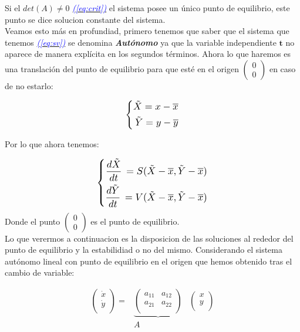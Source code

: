 \documentclass[12pt,a4paper]{report} %
\newcommand{\eref}[1]{\hyperref[#1]{\textcolor{blue}{\textit{(\ref*{#1})}}}}
\begin{document}
	Si el $det(A)\neq0$ \eref{eq:crit} el sistema posee un único punto de equilibrio, este punto se dice solucion constante del sistema.
    \\[0.5cm]
    Veamos esto más en profundiad, primero tenemos que saber que el sistema que tenemos \eref{eq:sv} se denomina \textit{\textbf{Autónomo}} ya que la variable independiente $\bm{t}$ no aparece de manera explícita en los segundos términos.
    \newpage
    Ahora lo que haremos es una translación del punto de equilibrio para que esté en el origen $\begin{pmatrix} 0 \\ 0
    \end{pmatrix}$ en caso de no estarlo:
    
	\begin{equation}
		\label{eq:trans}
		\scalebox{1.2}{$\displaystyle
			\left\{
			\begin{aligned}
				\tilde{X}=x-\overline{x} \\
				\tilde{Y}=y-\overline{y}
			\end{aligned}
			\right.
			$}
	\end{equation}\smallskip
	
	Por lo que ahora tenemos:
	
	\begin{equation}
		\label{eq:trans2}
		\scalebox{1.2}{$\displaystyle
			\left\{
			\begin{aligned}
				\frac{d\tilde{X}}{dt}\,=S(\tilde{X}-\overline{x},\tilde{Y}-\overline{x}) \\
				\frac{d\tilde{Y}}{dt}\,=V(\tilde{X}-\overline{x},\tilde{Y}-\overline{x})
			\end{aligned}
			\right.
			$}
	\end{equation}\smallskip
	Donde el punto $\begin{pmatrix} 0 \\ 0 \end{pmatrix}$ es el punto de equilibrio. \\[0.5cm]
	Lo que verermos a continuacion es la disposicion de las soluciones al rededor del punto de equilibrio y la estabilidiad o no del mismo. Considerando el sistema autónomo lineal con punto de equilibrio en el origen que hemos obtenido tras el cambio de variable:
	
	\begin{eqnarray}
		\label{eq:trans3}
			\begin{pmatrix}
				\dot{x}\\
				\dot{y}\\
			\end{pmatrix} =
			&\underbrace{\begin{pmatrix}
				a_{11} & a_{12}\\
				a_{21} & a_{22}\\
			\end{pmatrix}}&
			\begin{pmatrix}
				x\\
				y\\
			\end{pmatrix} \nonumber \\[1mm]
			&A&
	\end{eqnarray} \smallskip
	
\end{document}
